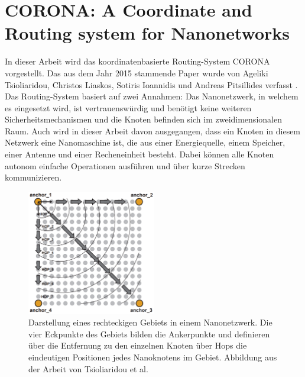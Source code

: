 \section{CORONA: A Coordinate and Routing system for Nanonetworks}

In dieser Arbeit wird das koordinatenbasierte Routing-System CORONA vorgestellt. Das aus dem Jahr 2015 stammende Paper wurde von Ageliki Tsioliaridou, Christos Liaskos, Sotiris Ioannidis und Andreas Pitsillides verfasst \cite{tsioliaridou2015corona}. Das Routing-System basiert auf zwei Annahmen: Das Nanonetzwerk, in welchem es eingesetzt wird, ist vertrauenswürdig und benötigt keine weiteren Sicherheitsmechanismen und die Knoten befinden sich im zweidimensionalen Raum. Auch wird in dieser Arbeit davon ausgegangen, dass ein Knoten in diesem Netzwerk eine Nanomaschine ist, die aus einer Energiequelle, einem Speicher, einer Antenne und einer Recheneinheit besteht. Dabei können alle Knoten autonom einfache Operationen ausführen und über kurze Strecken kommunizieren. 

\begin{figure}
    \centering
    \includegraphics[width=0.5\textwidth]{images/Corona.png}
    \caption[CORONA Ankerpunkte Verbildlichung]{Darstellung eines rechteckigen Gebiets in einem Nanonetzwerk. Die vier Eckpunkte des Gebiets bilden die Ankerpunkte und definieren über die Entfernung zu den einzelnen Knoten über Hops die eindeutigen Positionen jedes Nanoknotens im Gebiet. Abbildung aus der Arbeit von Tsioliaridou et al. \cite{tsioliaridou2015corona}}
    \label{fig:corona}
\end{figure}

